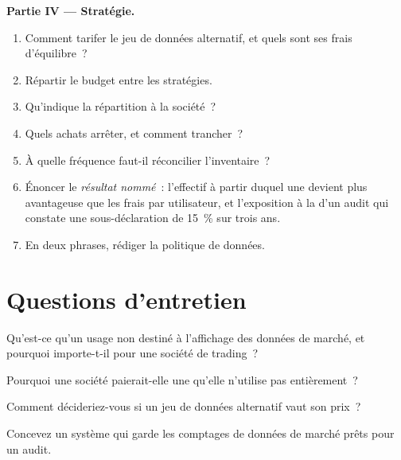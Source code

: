 \begin{problem}
\medskip\noindent\textbf{Partie IV --- Stratégie.}
\begin{enumerate}[resume]
\item Comment tarifer le jeu de données alternatif, et quels sont ses frais d'équilibre~?
\item Répartir le budget entre les stratégies.
\item Qu'indique la répartition à la société~?
\item Quels achats arrêter, et comment trancher~?
\item À quelle fréquence faut-il réconcilier l'inventaire~?
\item Énoncer le \emph{résultat nommé}~: l'effectif à partir duquel une  devient plus avantageuse que les frais par utilisateur, et l'exposition à la  d'un audit qui
constate une sous-déclaration de 15~\% sur trois ans.
\item En deux phrases, rédiger la politique de données.
\end{enumerate}
\end{problem}

\section{Questions d'entretien}

\begin{interviewq}\label{iq:fm:data-strategy-and-costs:1}
Qu'est-ce qu'un usage non destiné à l'affichage des données de marché, et pourquoi importe-t-il pour une société de trading~?
\end{interviewq}

\begin{interviewq}\label{iq:fm:data-strategy-and-costs:2}
Pourquoi une société paierait-elle une  qu'elle n'utilise pas entièrement~?
\end{interviewq}

\begin{interviewq}\label{iq:fm:data-strategy-and-costs:3}
Comment décideriez-vous si un jeu de données alternatif vaut son prix~?
\end{interviewq}

\begin{interviewq}\label{iq:fm:data-strategy-and-costs:4}
Concevez un système qui garde les comptages de données de marché prêts pour un audit.
\end{interviewq}

